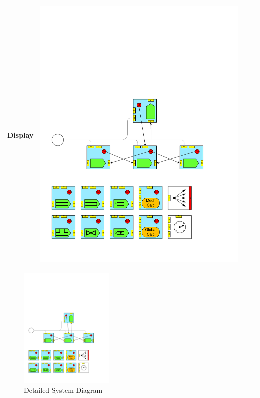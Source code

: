 \begin{table}
\begin{center}
\begin{tabular}{|p{2cm}|c|p{2cm}|c|}
Display 		&\includegraphics[page=20, scale=0.25]{./figs/1dcfd/ElementalProcessors.pdf} \\ \hline
\end{tabular}
\label{CELibrary}
\end{center}
\end{table}


%
\begin{figure}
\centering
\includegraphics[page=3, width=0.4\textwidth]{./figs/1dcfd/ElementalProcessors.pdf}
\caption{Detailed System Diagram}
\label{DetailedDiagram}
\end{figure}
%

